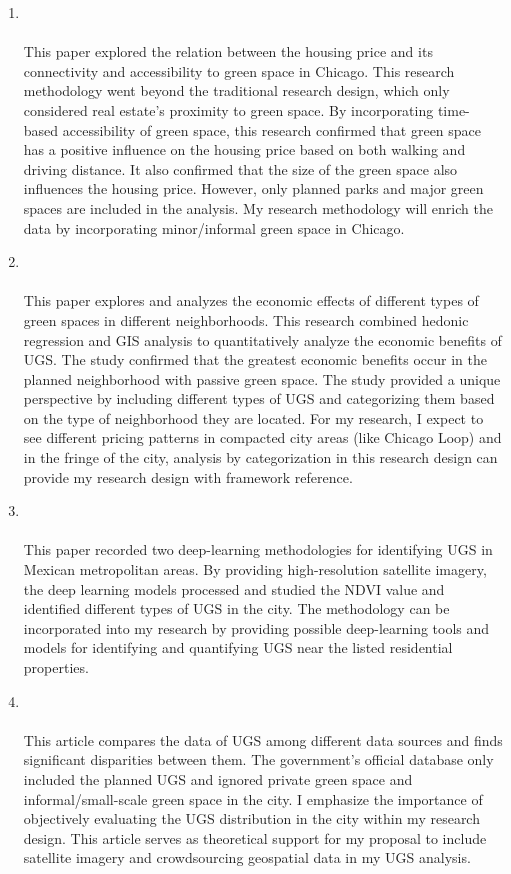 \documentclass{article}
\begin{document}
\begin{enumerate}
    \item  {}\\ \\ This paper explored the relation between the housing price and its connectivity and accessibility to green space in Chicago. This research methodology went beyond the traditional research design, which only considered real estate’s proximity to green space. By incorporating time-based accessibility of green space, this research confirmed that green space has a positive influence on the housing price based on both walking and driving distance. It also confirmed that the size of the green space also influences the housing price. However, only planned parks and major green spaces are included in the analysis. My research methodology will enrich the data by incorporating minor/informal green space in Chicago.

    \item  {}\\ \\ This paper explores and analyzes the economic effects of different types of green spaces in different neighborhoods. This research combined hedonic regression and GIS analysis to quantitatively analyze the economic benefits of UGS. The study confirmed that the greatest economic benefits occur in the planned neighborhood with passive green space. The study provided a unique perspective by including different types of UGS and categorizing them based on the type of neighborhood they are located. For my research, I expect to see different pricing patterns in compacted city areas (like Chicago Loop) and in the fringe of the city, analysis by categorization in this research design can provide my research design with framework reference.

    \item  {}\\ \\ This paper recorded two deep-learning methodologies for identifying UGS in Mexican metropolitan areas. By providing high-resolution satellite imagery, the deep learning models processed and studied the NDVI value and identified different types of UGS in the city. The methodology can be incorporated into my research by providing possible deep-learning tools and models for identifying and quantifying UGS near the listed residential properties.

    \item  {}\\ \\ This article compares the data of UGS among different data sources and finds significant disparities between them. The government's official database only included the planned UGS and ignored private green space and informal/small-scale green space in the city. I emphasize the importance of objectively evaluating the UGS distribution in the city within my research design. This article serves as theoretical support for my proposal to include satellite imagery and crowdsourcing geospatial data in my UGS analysis.


\end{enumerate}
\end{document}
